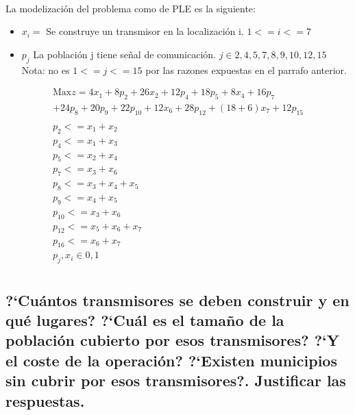 \documentclass[10pt, a4paper]{article}
\begin{document}
			\paragraph{}
			La modelización del problema como de PLE es la siguiente:

			\begin{itemize}
				\item \(x_{i} = \) Se construye un transmisor en la localización i. $1<= i <= 7$

				\item \(p_{j} \) La población j tiene señal de comunicación. $j \in {2,4,5,7,8,9,10,12,15}$ Nota: no es  $1<= j <= 15$ por las razones expuestas en el parrafo anterior.
			\end{itemize}

			\[
				\begin{split}
					\text{Max} z = 4x_{1} + 8p_{2} + 26x_{2} + 12p_{4} +18p_{5} + 8x_{4} + 16p_{7} \\
						+ 24p_{8} +20p_{9} + 22p_{10}  +  12x_{6} + 28p_{12} + (18+6)x_{7} + 12p_{15} \\ \\
						p_2 <= x_1 + x_2\\
						p_4 <= x_1 + x_3\\
						p_5 <= x_2 + x_4\\
						p_7 <= x_3 + x_6\\
						p_8 <= x_3 + x_4 + x_5\\
						p_9 <= x_4 + x_5\\
						p_10 <= x_3 + x_6\\
						p_12 <= x_5 + x_6 + x_7\\
						p_16 <= x_6 + x_7\\
						p_{j}, x_{i} \in {0,1}\\
				\end{split}
			\]


		\subsection{?`Cuántos transmisores se deben construir y en qué lugares? ?`Cuál es el tamaño de la población cubierto por esos transmisores? ?`Y el coste de la operación? ?`Existen municipios sin cubrir por esos transmisores?. Justificar las respuestas.}

			\paragraph{}
\end{document}

